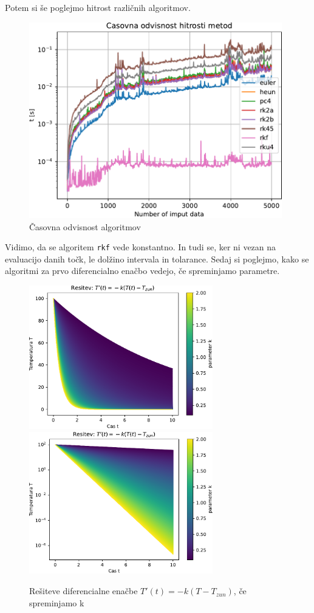 Potem si še poglejmo hitrost različnih algoritmov.
\begin{figure}[h]
    \centering
    \includegraphics[width=11cm]{pdfs/cas.pdf}
    \caption{Časovna odvisnost algoritmov}
\end{figure}
Vidimo, da se algoritem \verb|rkf| vede konstantno. In tudi se, ker ni vezan
na evaluacijo danih točk, le dolžino intervala in tolarance.
\newpage
Sedaj si poglejmo, kako se algoritmi za prvo diferencialno enačbo vedejo, če spreminjamo parametre.
\begin{figure}[h]
    \centering
    \includegraphics[width=8cm]{pdfs/T(t,k).pdf}
    \includegraphics[width=8cm]{pdfs/T(t,k)_log.pdf}

    \caption{Rešiteve diferencialne enačbe $T'(t) = -k(T-T_{zun})$, če spreminjamo k}
\end{figure}
